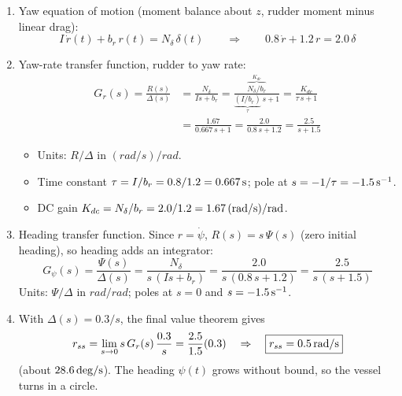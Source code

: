 \documentclass[11pt]{article}
\begin{document}
\begin{enumerate}[start=6]
\item Yaw equation of motion (moment balance about $z$, rudder moment minus linear drag):
\[
  \boxed{I\,\dot{r}(t) + b_r\,r(t) = N_\delta\,\delta(t)}
  \qquad\Rightarrow\qquad
  0.8\,\dot{r} + 1.2\,r = 2.0\,\delta
\]

\item Yaw-rate transfer function, rudder to yaw rate:
\[
  \boxed{\begin{aligned}
    G_r(s) = \frac{R(s)}{\Delta(s)} &= \frac{N_\delta}{I s + b_r} = \frac{\overbrace{N_\delta/b_r}^{K_{dc}}}{\underbrace{(I/b_r)}_{\tau}\,s + 1} = \frac{K_{dc}}{\tau\,s + 1} \\
                                    &= \frac{1.67}{0.667\,s + 1} = \frac{2.0}{0.8\,s + 1.2} = \frac{2.5}{s + 1.5}
  \end{aligned}}
\]
\begin{itemize}[nosep]
  \item Units: $R/\Delta$ in $\unit{(rad/s)/rad}$.
  \item Time constant $\tau = I/b_r = 0.8/1.2 = \unit[0.667]{s}$; pole at $s = -1/\tau = \unit[-1.5]{s^{-1}}$.
  \item DC gain $K_{dc} = N_\delta/b_r = 2.0/1.2 = \unit[1.67]{(rad/s)/rad}$.
\end{itemize}

\item Heading transfer function.  Since $r = \dot{\psi}$, $R(s) = s\,\Psi(s)$ (zero initial heading), so heading adds an integrator:
\[
  \boxed{G_\psi(s) = \frac{\Psi(s)}{\Delta(s)} = \frac{N_\delta}{s\,(I s + b_r)} = \frac{2.0}{s\,(0.8\,s + 1.2)} = \frac{2.5}{s\,(s + 1.5)}}
\]
Units: $\Psi/\Delta$ in $\unit{rad/rad}$; poles at $s = 0$ and $s = \unit[-1.5]{s^{-1}}$.

\item With $\Delta(s) = 0.3/s$, the final value theorem gives
\[
  r_{ss} = \lim_{s \to 0} s\,G_r(s)\,\frac{0.3}{s} = \frac{2.5}{1.5}(0.3)
  \quad\Rightarrow\quad
  \boxed{r_{ss} = \unit[0.5]{rad/s}}
\]
(about $\unit[28.6]{deg/s}$).  The heading $\psi(t)$ grows without bound, so the vessel turns in a circle.

\end{enumerate}
\end{document}
